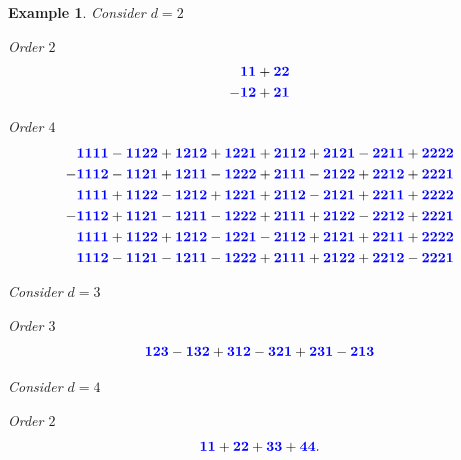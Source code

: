 \documentclass{scrartcl}
\theoremstyle{plain}
\newtheorem{example}[theorem]{Example}
\theoremstyle{definition}
\newcommand{\1}[1]{1_{\{#1\}}}
\newcommand{\ds}{d} %
\def\word#1{{\color{blue}\mathbf{#1}}}
\begin{document}
\begin{example}
  \label{ex:soInvariants}
  Consider $\ds=2$

  Order $2$
  \begin{align*}
  \word{11} + \word{22} \\
 - \word{12} + \word{21}
  \end{align*}

  Order $4$
  \begin{align*}
  \word{1111} - \word{1122} + \word{1212} + \word{1221} + \word{2112} + \word{2121} - \word{2211} + \word{2222} \\
 - \word{1112} - \word{1121} + \word{1211} - \word{1222} + \word{2111} - \word{2122} + \word{2212} + \word{2221} \\
  \word{1111} + \word{1122} - \word{1212} + \word{1221} + \word{2112} - \word{2121} + \word{2211} + \word{2222} \\
 - \word{1112} + \word{1121} - \word{1211} - \word{1222} + \word{2111} + \word{2122} - \word{2212} + \word{2221} \\
  \word{1111} + \word{1122} + \word{1212} - \word{1221} - \word{2112} + \word{2121} + \word{2211} + \word{2222} \\
  \word{1112} - \word{1121} - \word{1211} - \word{1222} + \word{2111} + \word{2122} + \word{2212} - \word{2221}
  \end{align*}

   Consider $\ds=3$

   Order $3$
   \begin{align*}
   \word{123} - \word{132} + \word{312} - \word{321} + \word{231} - \word{213}
   \end{align*}


   Consider $\ds=4$

   Order $2$
   \begin{align*}
    \word{11} + \word{22} + \word{33} + \word{44}.
   \end{align*}


\end{example}
\end{document}
